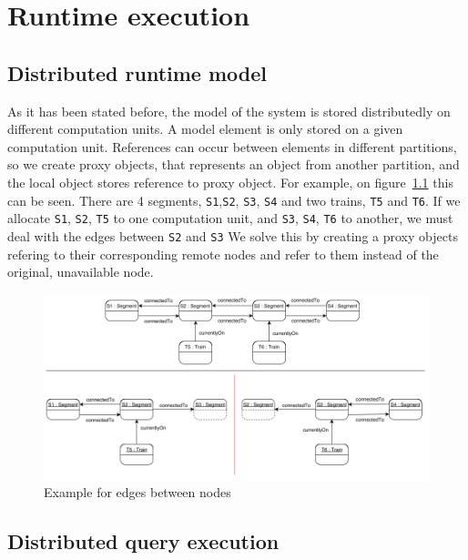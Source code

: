 %
\chapter{Runtime execution}
%


\section{Distributed runtime model}

As it has been stated before, the model of the system is stored distributedly on different computation units. A model element is only stored on a given computation unit. References can occur between elements in different partitions, so we create proxy objects, that represents an object from another partition, and the local object stores reference to proxy object. For example, on figure~\ref{fig:distrib-model-example} this can be seen. There are 4 segments, \texttt{S1},\texttt{S2}, \texttt{S3}, \texttt{S4} and two trains, \texttt{T5} and \texttt{T6}. If we allocate \texttt{S1}, \texttt{S2}, \texttt{T5} to one computation unit, and \texttt{S3}, \texttt{S4}, \texttt{T6} to another, we must deal with the edges between \texttt{S2} and \texttt{S3} We solve this by creating a proxy objects refering to their corresponding remote nodes and refer to them instead of the original, unavailable node.

\begin{figure}[h]
	\begin{center}
		\includegraphics[width=\textwidth]{figures/distributed-model.png}
		\caption{Example for edges between nodes}
		\label{fig:distrib-model-example}
	\end{center}
\end{figure}




\section{Distributed query execution}


